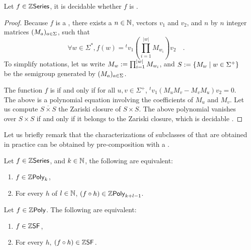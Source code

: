 \begin{lemma}
    \label{decidable-commutative-rat:lemma}
    Let $f \in \mathbb{Z}\mathsf{Series}$, it is decidable whether
    $f$ is .
\end{lemma}
\begin{proof}
    Because $f$ is a ,
    there exists a $n \in \mathbb{N}$,
    vectors $v_1$ and $v_2$,
    and $n$ by $n$ integer matrices $(M_a)_{a \in \Sigma}$,
    such that
    \begin{equation*}
        \forall w \in \Sigma^*,
        f(w) = {}^t v_1 \left(\prod_{i = 1}^{|w|} M_{w_i}\right) v_2 \quad .
    \end{equation*}
    To simplify notations, 
    let us write $M_w \mathrel{:=} \prod_{i = 1}^{|w|} M_{w_i}$,
    and 
    $S \mathrel{:=} \mathopen{\{} M_w \mid w \in \Sigma^+ \mathclose{\}}$ be the
    semigroup generated by $(M_a)_{a \in \Sigma}$.

    The function $f$ is  if and only if for all $u,v \in
    \Sigma^+$, ${}^t v_1 (M_u M_v  - M_v M_u) v_2 = 0$. The above is a
    polynomial equation involving the coefficients of $M_u$ and $M_v$.
    Let us compute $\overline{S \times S}$ the Zariski closure of $S \times S$.
    The above polynomial vanishes over $S \times S$ if and only
    if it belongs to the Zariski closure, which is decidable
    \cite{HROUPOWO18}.
\end{proof}

Let us briefly remark that the characterizations of subclasses of
 that are obtained in practice can be obtained by
pre-composition with a  .

\begin{remark}
    Let $f \in \mathbb{Z}\mathsf{Series}$, and $k \in \mathbb{N}$,
    the following are equivalent:
    \begin{enumerate}
        \item $f \in \ZPoly[k]$,
        \item For every   $h$
            of  $l \in \mathbb{N}$,
            $(f \circ h) \in \ZPoly[k+l-1]$.
    \end{enumerate}
\end{remark}


\begin{remark}
    Let $f \in \ZPoly$.
    The following are equivalent:
    \begin{enumerate}
        \item $f \in \ZSF$,
        \item For every   $h$,
            $(f \circ h) \in \ZSF$.
    \end{enumerate}
\end{remark}

